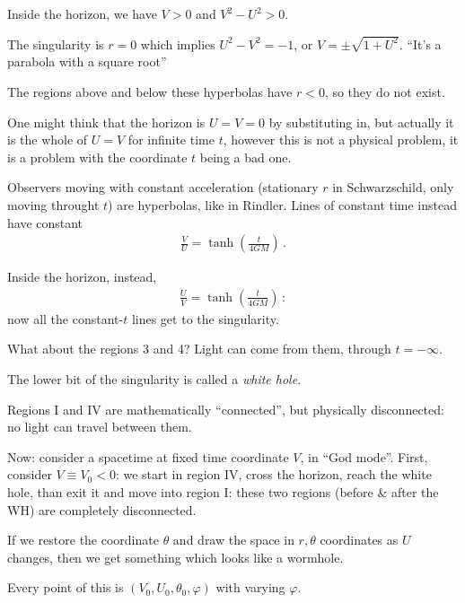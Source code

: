\documentclass[main.tex]{subfiles}
\begin{document}
Inside the horizon, we have \(V>0\) and \(V^2-U^2>0\). 

The singularity is \(r=0\) which implies \(U^2- V^2 = -1\), or \(V = \pm \sqrt{1 + U^2}\). 
``It's a parabola with a square root'' 

The regions above and below these hyperbolas have \(r<0\), so they do not exist. 

One might think that the horizon is \(U = V = 0\) by substituting in, but actually it is the whole of \(U = V\) for infinite time \(t\), however this is not a physical problem, it is a problem with the coordinate \(t\) being a bad one. 

Observers moving with constant acceleration (stationary \(r\) in Schwarzschild, only moving throught \(t\)) are hyperbolas, like in Rindler. Lines of constant time instead have constant 
%
\begin{align}
  \frac{V}{U} = \tanh(\frac{t}{4GM})
\,.
\end{align}

Inside the horizon, instead, 
 \begin{align}
   \frac{U}{V} = \tanh(\frac{t}{4GM})
 \,:
 \end{align}
now all the constant-\(t\) lines get to the singularity. 

What about the regions 3 and 4? Light can come from them, through \(t = - \infty\). 

The lower bit of the singularity is called a \emph{white hole}. 

Regions I and IV are mathematically ``connected'', but physically disconnected: no light can travel between them. 

Now: consider a spacetime at fixed time coordinate \(V\), in ``God mode''. 
First, consider \(V \equiv V_0 < 0\): we start in region IV, cross the horizon, reach the white hole, than exit it and move into region I: these two regions (before \& after the WH) are completely disconnected.   


If we restore the coordinate \(\theta \) and draw the space in \(r, \theta \) coordinates as \(U\) changes, then we get something which looks like a wormhole. 

Every point of this is \((V_0, U_0 , \theta_0 ,  \varphi  )\) with varying \(\varphi \). 
\end{document}
